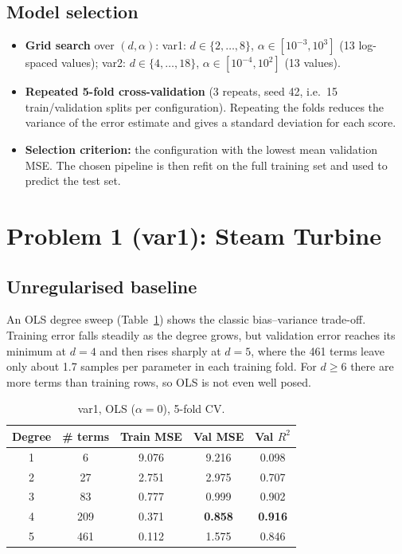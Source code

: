 \documentclass[11pt,a4paper]{article}
\begin{document}
\subsection{Model selection}
\begin{itemize}
  \item \textbf{Grid search} over $(d,\alpha)$:
        var1: $d\in\{2,\dots,8\}$, $\alpha\in[10^{-3},10^{3}]$ (13 log-spaced values);
        var2: $d\in\{4,\dots,18\}$, $\alpha\in[10^{-4},10^{2}]$ (13 values).
  \item \textbf{Repeated 5-fold cross-validation} (3 repeats, seed 42, i.e.\ 15
        train/validation splits per configuration). Repeating the folds reduces the
        variance of the error estimate and gives a standard deviation for each score.
  \item \textbf{Selection criterion:} the configuration with the lowest mean
        validation MSE. The chosen pipeline is then refit on the full training set
        and used to predict the test set.
\end{itemize}

\section{Problem 1 (var1): Steam Turbine}

\subsection{Unregularised baseline}
An OLS degree sweep (Table~\ref{tab:v1ols}) shows the classic bias--variance
trade-off. Training error falls steadily as the degree grows, but validation error
reaches its minimum at $d{=}4$ and then rises sharply at $d{=}5$, where the 461
terms leave only about 1.7 samples per parameter in each training fold. For
$d\ge6$ there are more terms than training rows, so OLS is not even well posed.

\begin{table}[H]
\centering
\small
\begin{tabular}{ccccc}
\toprule
Degree & \# terms & Train MSE & Val MSE & Val $R^2$ \\
\midrule
1 & 6   & 9.076 & 9.216 & 0.098 \\
2 & 27  & 2.751 & 2.975 & 0.707 \\
3 & 83  & 0.777 & 0.999 & 0.902 \\
4 & 209 & 0.371 & \textbf{0.858} & \textbf{0.916} \\
5 & 461 & 0.112 & 1.575 & 0.846 \\
\bottomrule
\end{tabular}
\caption{var1, OLS ($\alpha{=}0$), 5-fold CV.}
\label{tab:v1ols}
\end{table}
\end{document}
